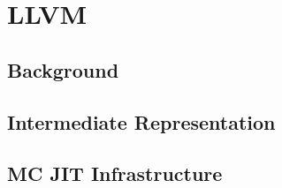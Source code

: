 \chapter{LLVM}
\section{Background}
\section{Intermediate Representation}
\section{MC JIT Infrastructure}
